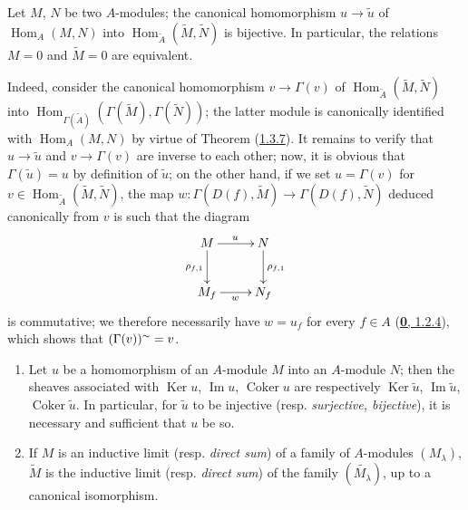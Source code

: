 \begin{corollary}[1.3.8]
\label{I.1.3.8}
Let $M$, $N$ be two $A$-modules; the canonical homomorphism
$u\to\widetilde{u}$ of $\operatorname{Hom}_A(M,N)$ into
$\operatorname{Hom}_{\widetilde{A}}(\widetilde{M},\widetilde{N})$ is
bijective. In particular, the relations $M=0$ and $\widetilde{M}=0$ are
equivalent.
\end{corollary}

Indeed, consider the canonical homomorphism $v\to\Gamma(v)$ of
$\operatorname{Hom}_{\widetilde{A}}(\widetilde{M},\widetilde{N})$ into
$\operatorname{Hom}_{\Gamma(\widetilde{A})}
(\Gamma(\widetilde{M}),\Gamma(\widetilde{N}))$; the latter module is
canonically identified with $\operatorname{Hom}_A(M,N)$ by virtue of Theorem
(\hyperref[I.1.3.7]{1.3.7}). It remains to verify that
$u\to\widetilde{u}$ and $v\to\Gamma(v)$ are inverse to each
other; now, it is obvious that $\Gamma(\widetilde{u})=u$ by definition of
$\widetilde{u}$; on the other hand, if we set $u=\Gamma(v)$ for
$v\in\operatorname{Hom}_{\widetilde{A}}(\widetilde{M},\widetilde{N})$,
the map
$w:\Gamma(D(f),\widetilde{M})\to\Gamma(D(f),\widetilde{N})$ deduced
canonically from $v$ is such that the diagram
\[
  \xymatrix{
    M\ar[r]^u\ar[d]_{\rho_{f,1}} & N\ar[d]^{\rho_{f,1}}\\
    M_f\ar[r]_w & N_f
  }
\]
is commutative; we therefore necessarily have $w=u_f$ for every $f\in A$
(\hyperref[0.1.2.4]{\textbf{0}, 1.2.4}), which shows that
$(\Gamma(v))^{\sim}=v$.

\begin{corollary}[1.3.9]
\label{I.1.3.9}
\begin{enumerate}
  \item[\rm(i)] Let $u$ be a homomorphism of an $A$-module $M$ into an
  $A$-module $N$; then the sheaves associated with $\operatorname{Ker}u$,
  $\operatorname{Im}u$, $\operatorname{Coker}u$ are respectively
  $\operatorname{Ker}\widetilde{u}$, $\operatorname{Im}\widetilde{u}$,
  $\operatorname{Coker}\widetilde{u}$. In particular, for
  $\widetilde{u}$ to be injective \textup{(resp. \emph{surjective, bijective})}, it is
  necessary and sufficient that $u$ be so.
  \item[\rm(ii)] If $M$ is an inductive limit \textup{(resp. \emph{direct sum})} of a
  family of $A$-modules $(M_\lambda)$, $\widetilde{M}$ is the inductive limit
  \textup{(resp. \emph{direct sum})} of the family $(\widetilde{M_\lambda})$, up to a
  canonical isomorphism.
\end{enumerate}
\end{corollary}

